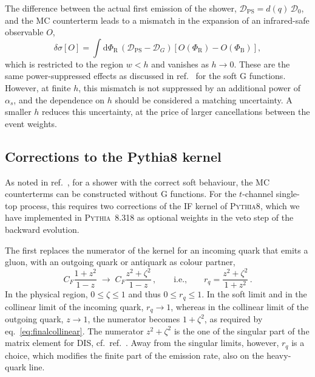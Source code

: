 \documentclass[a4paper,11pt]{article}
\newcommand{\as}{\alpha_s}
\newcommand{\dd}{\mathrm{d}}
\newcommand{\pythia}{\textsc{Pythia8}\xspace}
\newcommand{\Dens}{\mathcal{D}}
\newcommand{\PhiB}{\Phi_{\mathrm{B}}}
\newcommand{\PhiR}{\Phi_{\mathrm{R}}}
\begin{document}
The difference between the actual first emission of the shower,
$\Dens_{\mathrm{PS}}=d(q)\,\Dens_0$, and the MC counterterm leads to a
mismatch in the expansion of an infrared-safe observable $O$,
\begin{equation}
  \delta\sigma[O]=\int\dd\PhiR\,\left(\Dens_{\mathrm{PS}}-\Dens_G\right)
  \left[O(\PhiR)-O(\PhiB)\right],
  \label{eq:mismatch}
\end{equation}
which is restricted to the region $w<h$ and vanishes as $h\to0$.
These are the same power-suppressed effects as discussed in
ref.~\cite{Alwall:2014hca} for the soft G functions. However, at
finite $h$, this mismatch is not suppressed by an additional power of
$\as$, and the dependence on $h$ should be considered a matching
uncertainty. A smaller $h$ reduces this uncertainty, at the price of
larger cancellations between the event weights.

\subsection{Corrections to the Pythia8 kernel}
\label{sec:patches}

As noted in ref.~\cite{Alwall:2014hca}, for a shower with the correct
soft behaviour, the MC counterterms can be constructed without G
functions. For the $t$-channel single-top process, this requires two
corrections of the IF kernel of \pythia, which we have implemented in
\textsc{Pythia}~8.318 as optional weights in the veto step of the backward
evolution.

The first replaces the numerator of the kernel for an incoming quark
that emits a gluon, with an outgoing quark or antiquark as colour
partner,
\begin{equation}
  C_F\frac{1+z^2}{1-z}\;\longrightarrow\;C_F\frac{z^2+\zeta^2}{1-z}\,,
  \qquad\text{i.e.,}\qquad
  r_q=\frac{z^2+\zeta^2}{1+z^2}\,.
  \label{eq:rq}
\end{equation}
In the physical region, $0\le\zeta\le1$ and thus $0\le r_q\le1$. In the
soft limit and in the collinear limit of the incoming quark, $r_q\to1$,
whereas in the collinear limit of the outgoing quark, $z\to1$, the
numerator becomes $1+\zeta^2$, as required by
eq.~\eqref{eq:finalcollinear}. The numerator $z^2+\zeta^2$ is the one
of the singular part of the matrix element for DIS, cf.\
ref.~\cite{Cabouat:2017rzi}. Away from the singular limits, however,
$r_q$ is a choice, which modifies the finite part of the emission rate,
also on the heavy-quark line.
\end{document}
